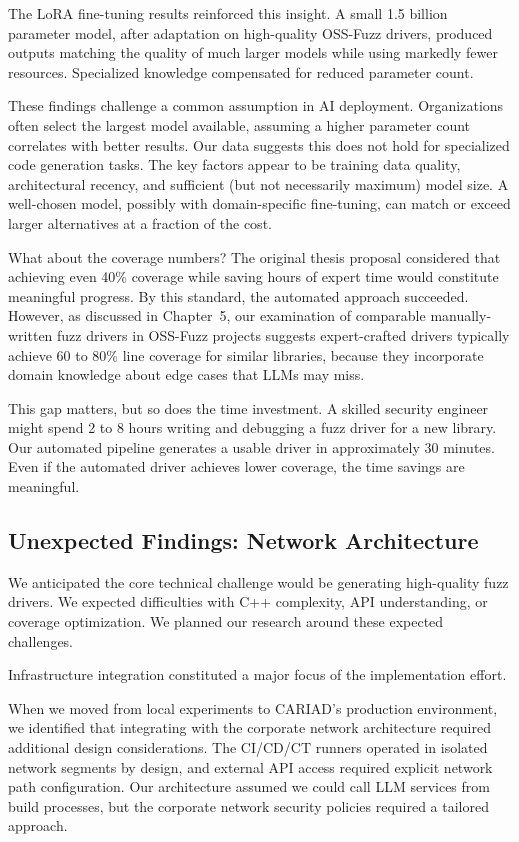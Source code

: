 The LoRA fine-tuning results reinforced this insight. A small 1.5 billion parameter model, after adaptation on high-quality OSS-Fuzz drivers, produced outputs matching the quality of much larger models while using markedly fewer resources. Specialized knowledge compensated for reduced parameter count.

These findings challenge a common assumption in AI deployment. Organizations often select the largest model available, assuming a higher parameter count correlates with better results. Our data suggests this does not hold for specialized code generation tasks. The key factors appear to be training data quality, architectural recency, and sufficient (but not necessarily maximum) model size. A well-chosen model, possibly with domain-specific fine-tuning, can match or exceed larger alternatives at a fraction of the cost.

What about the coverage numbers? The original thesis proposal considered that achieving even 40\% coverage while saving hours of expert time would constitute meaningful progress. By this standard, the automated approach succeeded. However, as discussed in Chapter~5, our examination of comparable manually-written fuzz drivers in OSS-Fuzz projects suggests expert-crafted drivers typically achieve 60 to 80\% line coverage for similar libraries, because they incorporate domain knowledge about edge cases that LLMs may miss.

This gap matters, but so does the time investment. A skilled security engineer might spend 2 to 8 hours writing and debugging a fuzz driver for a new library. Our automated pipeline generates a usable driver in approximately 30 minutes. Even if the automated driver achieves lower coverage, the time savings are meaningful.


\subsection{Unexpected Findings: Network Architecture}
\label{sec:discussion_network}

We anticipated the core technical challenge would be generating high-quality fuzz drivers. We expected difficulties with C++ complexity, API understanding, or coverage optimization. We planned our research around these expected challenges.

Infrastructure integration constituted a major focus of the implementation effort.

When we moved from local experiments to CARIAD's production environment, we identified that integrating with the corporate network architecture required additional design considerations. The CI/CD/CT runners operated in isolated network segments by design, and external API access required explicit network path configuration. Our architecture assumed we could call LLM services from build processes, but the corporate network security policies required a tailored approach.

